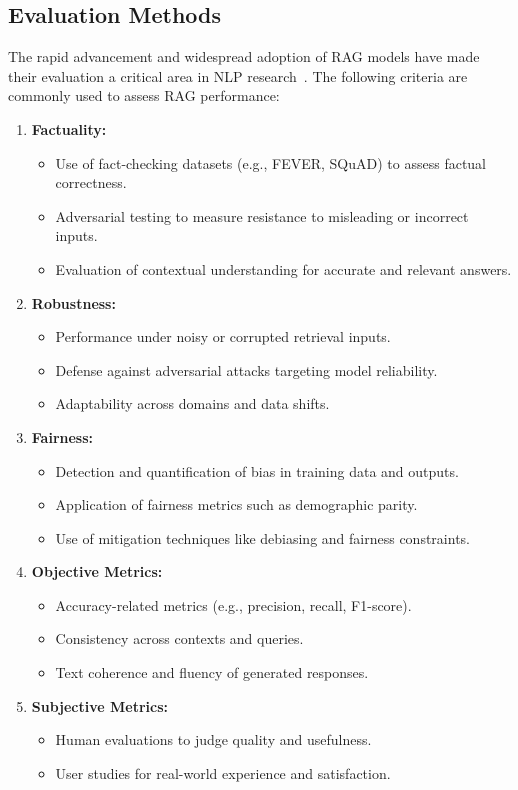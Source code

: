 \subsection{Evaluation Methods}
The rapid advancement and widespread adoption of RAG models have made their evaluation a critical area in NLP research~\citep{zhou2020trustworthiness}. The following criteria are commonly used to assess RAG performance:

\begin{enumerate}
	\item \textbf{Factuality:} 
	\begin{itemize}
		\item Use of fact-checking datasets (e.g., FEVER, SQuAD) to assess factual correctness.
		\item Adversarial testing to measure resistance to misleading or incorrect inputs.
		\item Evaluation of contextual understanding for accurate and relevant answers.
	\end{itemize}
	
	\item \textbf{Robustness:}
	\begin{itemize}
		\item Performance under noisy or corrupted retrieval inputs.
		\item Defense against adversarial attacks targeting model reliability.
		\item Adaptability across domains and data shifts.
	\end{itemize}
	
	\item \textbf{Fairness:}
	\begin{itemize}
		\item Detection and quantification of bias in training data and outputs.
		\item Application of fairness metrics such as demographic parity.
		\item Use of mitigation techniques like debiasing and fairness constraints.
	\end{itemize}
	
	\item \textbf{Objective Metrics:}
	\begin{itemize}
		\item Accuracy-related metrics (e.g., precision, recall, F1-score).
		\item Consistency across contexts and queries.
		\item Text coherence and fluency of generated responses.
	\end{itemize}
	
	\item \textbf{Subjective Metrics:}
	\begin{itemize}
		\item Human evaluations to judge quality and usefulness.
		\item User studies for real-world experience and satisfaction.
	\end{itemize}
\end{enumerate}

